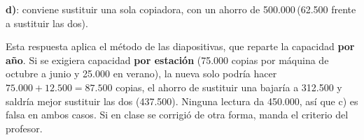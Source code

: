 \documentclass[10pt,a4paper,twoside]{article}
\newcommand{\eur}{\,\text{€}\xspace}
\begin{document}
\begin{solucion}
\textbf{d)}: conviene sustituir una sola copiadora, con un ahorro de 500.000\eur (62.500 frente a sustituir las dos).
\end{solucion}
\begin{trampa}
Esta respuesta aplica el método de las diapositivas, que reparte la capacidad \textbf{por año}. Si se exigiera
capacidad \textbf{por estación} (75.000 copias por máquina de octubre a junio y 25.000 en verano), la nueva solo podría
hacer $75.000+12.500=87.500$ copias, el ahorro de sustituir una bajaría a 312.500 y saldría mejor sustituir las dos
(437.500). Ninguna lectura da 450.000, así que c) es falsa en ambos casos. Si en clase se corrigió de otra forma,
manda el criterio del profesor.
\end{trampa}
\end{document}
